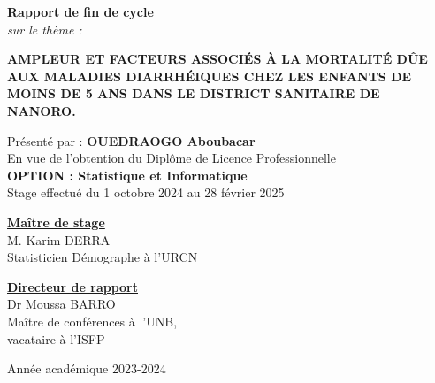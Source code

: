 \documentclass[12pt,a4paper]{report}
\begin{document}
	\vspace{0.4cm}
	
	\begin{center}
		\textcolor{black!70}{\textbf{\LARGE Rapport de fin de cycle}}\\
		\textit{ sur le thème :}
	\end{center}
	
	\begin{center}
		\begin{tcolorbox}[colback=mycolor, colframe=mycolor, width=1\textwidth, boxrule=0.6mm, arc=1mm ]
			\centering
			\textcolor{moncolor}{\MakeUppercase{\textbf{\small
			Ampleur et facteurs associés à la mortalité dûe aux maladies diarrhéiques chez les enfants de moins de 5 ans dans le district sanitaire de Nanoro.}}}
		\end{tcolorbox}
	\end{center}
	\begin{center}
		Présenté par : \textbf{OUEDRAOGO Aboubacar}\\
		\small En vue de l'obtention du Diplôme de Licence Professionnelle \\
		\textbf{\large OPTION : Statistique et Informatique}\\
		\small Stage effectué du 1 octobre 2024 au 28 février 2025 \\
	\end{center}
	
\vspace{0.5cm}

	\begin{minipage}{0.6\textwidth}
		\textbf{\underline{Maître de stage}}\\
		M. Karim DERRA\\
		Statisticien Démographe à l'URCN\\
	\end{minipage}
	\begin{minipage}{0.6\textwidth}
		\textbf{\underline{Directeur de rapport}}\\
		Dr Moussa BARRO\\
		Maître de conférences à l’UNB,\\
		vacataire à l'ISFP
	\end{minipage}
	
	\vspace{1cm}
	\begin{center}
		Année académique 2023-2024
	\end{center}
	
	\thispagestyle{empty}
	
\end{document}
